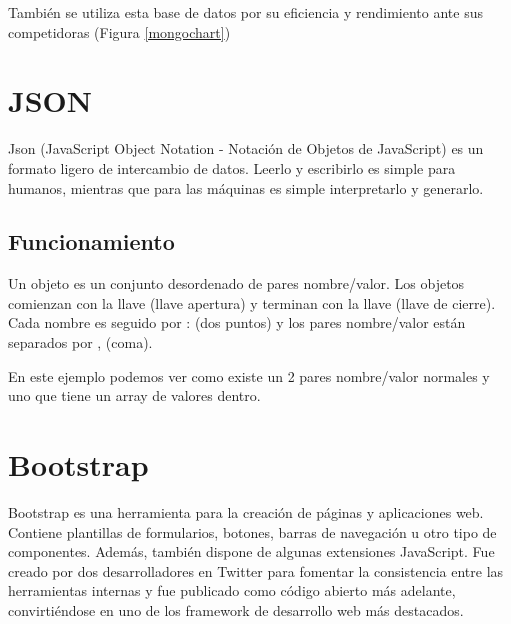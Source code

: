 También se utiliza esta base de datos por su eficiencia y rendimiento\cite{benchmark} ante sus competidoras (Figura \ref{mongochart})\\



\section{JSON}
Json\cite{json} (JavaScript Object Notation - Notación de Objetos de JavaScript) es un formato ligero de intercambio de datos. Leerlo y escribirlo es simple para humanos, mientras que para las máquinas es simple interpretarlo y generarlo.

\subsection{Funcionamiento}
Un objeto es un conjunto desordenado de pares nombre/valor. Los objetos comienzan con la llave { (llave apertura) y terminan con la llave } (llave de cierre). Cada nombre es seguido por : (dos puntos) y los pares nombre/valor están separados por , (coma).\\


En este ejemplo podemos ver como existe un 2 pares nombre/valor normales y uno que tiene un array de valores dentro.\\


\section{Bootstrap}
Bootstrap\cite{bootstrap} es una herramienta para la creación de páginas y aplicaciones web. Contiene plantillas de formularios, botones, barras de navegación u otro tipo de componentes. Además, también dispone de algunas extensiones JavaScript. Fue creado por dos desarrolladores en Twitter para fomentar la consistencia entre las herramientas internas y fue publicado como código abierto más adelante, convirtiéndose en uno de los framework de desarrollo web más destacados. \\

